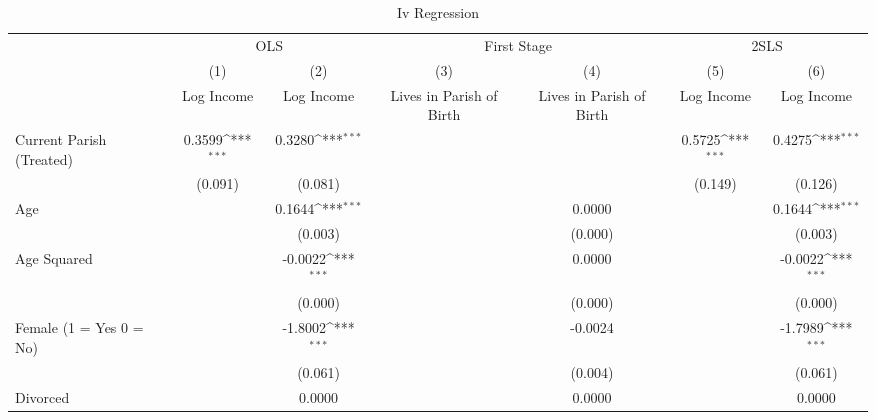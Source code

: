 \begin{table}[htbp]\centering
\def\sym#1{\ifmmode^{#1}\else\(^{#1}\)\fi}
\caption{Iv Regression \label{columns}}
\begin{tabular}{l*{6}{c}}
\hline\hline
                    &\multicolumn{2}{c}{OLS}                    &\multicolumn{2}{c}{First Stage}            &\multicolumn{2}{c}{2SLS}                   \\\cmidrule(lr){2-3}\cmidrule(lr){4-5}\cmidrule(lr){6-7}
                    &\multicolumn{1}{c}{(1)}&\multicolumn{1}{c}{(2)}&\multicolumn{1}{c}{(3)}&\multicolumn{1}{c}{(4)}&\multicolumn{1}{c}{(5)}&\multicolumn{1}{c}{(6)}\\
                    &\multicolumn{1}{c}{Log Income}&\multicolumn{1}{c}{Log Income}&\multicolumn{1}{c}{Lives in Parish of Birth}&\multicolumn{1}{c}{Lives in Parish of Birth}&\multicolumn{1}{c}{Log Income}&\multicolumn{1}{c}{Log Income}\\
\hline
Current Parish (Treated)&      0.3599\sym{***}&      0.3280\sym{***}&                     &                     &      0.5725\sym{***}&      0.4275\sym{***}\\
                    &     (0.091)         &     (0.081)         &                     &                     &     (0.149)         &     (0.126)         \\
[1em]
Age                 &                     &      0.1644\sym{***}&                     &      0.0000         &                     &      0.1644\sym{***}\\
                    &                     &     (0.003)         &                     &     (0.000)         &                     &     (0.003)         \\
[1em]
Age Squared         &                     &     -0.0022\sym{***}&                     &      0.0000         &                     &     -0.0022\sym{***}\\
                    &                     &     (0.000)         &                     &     (0.000)         &                     &     (0.000)         \\
[1em]
Female (1 = Yes 0 = No)&                     &     -1.8002\sym{***}&                     &     -0.0024         &                     &     -1.7989\sym{***}\\
                    &                     &     (0.061)         &                     &     (0.004)         &                     &     (0.061)         \\
[1em]
Divorced            &                     &      0.0000         &                     &      0.0000         &                     &      0.0000         \\

\end{tabular}
\end{table}

